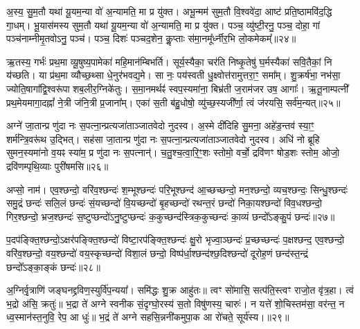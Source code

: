 अ॒स्य॒ सु॒म॒तौ यथा॑ यू॒यम॒न्या वो॑ अ॒न्यामति॒ मा प्र यु॑क्त। अभू॒न्मम॑ सुम॒तौ वि॒श्ववे॑दा॒ आष्ट॑ प्रति॒ष्ठामवि॑द॒द्धि गा॒धम्। भू॒यास॑मस्य सुम॒तौ यथा॑ यू॒यम॒न्या वो॑ अ॒न्यामति॒ मा प्र यु॑क्त। पञ्च॒ व्यु॑ष्टी॒रनु॒ पञ्च॒ दोहा॒ गां पञ्च॑नाम्नीमृ॒तवो\-ऽनु॒ पञ्च॑। पञ्च॒ दिशः॑ पञ्चद॒शेन॒ कॢ॒प्ताः स॑मा॒नमू᳚र्ध्नीर॒भि लो॒कमेकम्᳚॥२४॥

ऋ॒तस्य॒ गर्भः॑ प्रथ॒मा व्यू॒षुष्य॒पामेका॑ महि॒मान॑म्बिभर्ति। सूर्य॒स्यैका॒ चर॑ति निष्कृ॒तेषु॑ घ॒र्मस्यैका॑ सवि॒तैकां॒ नि य॑च्छति। या प्र॑थ॒मा व्यौच्छ॒थ्सा धे॒नुर॑भवद्य॒मे। सा नः॒ पय॑स्वती धु॒क्ष्वोत्त॑रामुत्तरा॒ꣳ॒ समा᳚म्। शु॒क्रर्\mbox{}ष॑भा॒ नभ॑सा॒ ज्योति॒षागा᳚द्वि॒श्वरू॑पा शब॒लीर॒ग्निके॑तुः। स॒मा॒नमर्थꣴ॑ स्वप॒स्यमा॑ना॒ बिभ्र॑ती ज॒राम॑जर उष॒ आगाः᳚। ऋ॒तू॒नाम्पत्नी᳚ प्रथ॒मेयमागा॒दह्नां᳚ ने॒त्री ज॑नि॒त्री प्र॒जाना᳚म्। एका॑ स॒ती ब॑हु॒धोषो॒ व्यु॑च्छ॒स्यजी᳚र्णा॒ त्वं ज॑रयसि॒ सर्व॑म॒न्यत्॥२५॥

{\anuvakamend[{ऊर्ज॒मेका᳚ प्रतिमु॒ञ्चमा॑ना भू॒यास॒मेकं॒ पत्न्येका॒न्नविꣳ॑श॒तिश्च॑॥11॥}]}

अग्ने॑ जा॒तान्प्र णु॑दा नः स॒पत्ना॒न्प्रत्यजा॑ताञ्जातवेदो नुदस्व। अ॒स्मे दी॑दिहि सु॒मना॒ अहे॑ड॒न्तव॑ स्या॒ꣳ॒ शर्म॑न्त्रि॒वरू॑थ उ॒द्भित्। सह॑सा जा॒तान्प्र णु॑दा नः स॒पत्ना॒न्प्रत्यजा॑ताञ्जातवेदो नुदस्व। अधि॑ नो ब्रूहि सुमन॒स्यमा॑नो व॒यꣴ स्या॑म॒ प्र णु॑दा नः स॒पत्नान्॑। च॒तु॒श्च॒त्वा॒रि॒ꣳ॒शः स्तोमो॒ वर्चो॒ द्रवि॑णꣳ षोड॒शः स्तोम॒ ओजो॒ द्रवि॑णम्पृथि॒व्याः पुरी॑षमसि॥२६॥

अप्सो॒ नाम॑। एव॒श्छन्दो॒ वरि॑व॒श्छन्दः॑ श॒म्भूश्छन्दः॑ परि॒भूश्छन्द॑ आ॒च्छच्छन्दो॒ मन॒श्छन्दो॒ व्यच॒श्छन्दः॒ सिन्धु॒श्छन्दः॑ समु॒द्रं छन्दः॑ सलि॒लं छन्दः॑ सं॒यच्छन्दो॑ वि॒यच्छन्दो॑ बृ॒हच्छन्दो॑ रथन्त॒रं छन्दो॑ निका॒यश्छन्दो॑ विव॒धश्छन्दो॒ गिर॒श्छन्दो॒ भ्रज॒श्छन्दः॑ स॒ष्टुप्छन्दो॑\-ऽनु॒ष्टुप्छन्दः॑ क॒कुच्छन्द॑स्त्रिक॒कुच्छन्दः॑ का॒व्यं छन्दो᳚\-ऽङ्कु॒पं छन्दः॑॥२७॥

प॒दप॑ङ्क्ति॒श्छन्दो॒\-ऽक्षर॑पङ्क्ति॒श्छन्दो॑ विष्टा॒रप॑ङ्क्ति॒श्छन्दः॑ क्षु॒रो भृज्वा॒ञ्छन्दः॑ प्र॒च्छच्छन्दः॑ प॒क्षश्छन्द॒ एव॒श्छन्दो॒ वरि॑व॒श्छन्दो॒ वय॒श्छन्दो॑ वय॒स्कृच्छन्दो॑ विशा॒लं छन्दो॒ विष्प॑र्धा॒श्छन्द॑श्छ॒दिश्छन्दो॑ दूरोह॒णं छन्द॑स्त॒न्द्रं छन्दो᳚\-ऽङ्का॒ङ्कं छन्दः॑॥२८॥

{\anuvakamend[{अ॒स्य॒ङ्कु॒पञ्छन्द॒स्त्रय॑स्त्रिꣳशच्च॥12॥}]}

अ॒ग्निर्वृ॒त्राणि॑ जङ्घनद्द्रविण॒स्युर्वि॑प॒न्यया᳚। समि॑द्धः शु॒क्र आहु॑तः॥ त्वꣳ सो॑मासि॒ सत्प॑ति॒स्त्वꣳ राजो॒त वृ॑त्र॒हा। त्वं भ॒द्रो अ॑सि॒ क्रतुः॑॥ भ॒द्रा ते॑ अग्ने स्वनीक सं॒दृग्घो॒रस्य॑ स॒तो विषु॑णस्य॒ चारुः॑। न यत्ते॑ शो॒चिस्तम॑सा॒ वर॑न्त॒ न ध्व॒स्मान॑स्त॒नुवि॒ रेप॒ आ धुः॑॥ भ॒द्रं ते॑ अग्ने सहसि॒न्ननी॑कमुपा॒क आ रो॑चते॒ सूर्य॑स्य।॥२९॥


